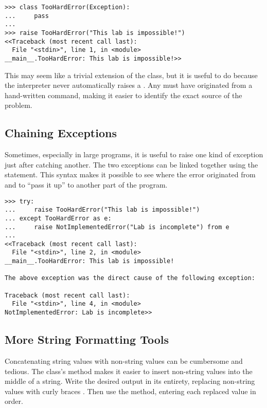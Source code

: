 \begin{lstlisting}
>>> class TooHardError(Exception):
...     pass
...
>>> raise TooHardError("This lab is impossible!")
<<Traceback (most recent call last):
  File "<stdin>", line 1, in <module>
__main__.TooHardError: This lab is impossible!>>
\end{lstlisting}

This may seem like a trivial extension of the  class, but it is useful to do because the interpreter never automatically raises a .
Any  must have originated from a hand-written  command, making it easier to identify the exact source of the problem.

\subsection*{Chaining Exceptions} %

Sometimes, especially in large programs, it is useful to raise one kind of exception just after catching another.
The two exceptions can be linked together using the  statement.
This syntax makes it possible to see where the error originated from and to ``pass it up'' to another part of the program.

\begin{lstlisting}
>>> try:
...     raise TooHardError("This lab is impossible!")
... except TooHardError as e:
...     raise NotImplementedError("Lab is incomplete") from e
...
<<Traceback (most recent call last):
  File "<stdin>", line 2, in <module>
__main__.TooHardError: This lab is impossible!

The above exception was the direct cause of the following exception:

Traceback (most recent call last):
  File "<stdin>", line 4, in <module>
NotImplementedError: Lab is incomplete>>
\end{lstlisting}

\subsection*{More String Formatting Tools} %

Concatenating string values with non-string values can be cumbersome and tedious.
The  class's  method makes it easier to insert non-string values into the middle of a string.
Write the desired output in its entirety, replacing non-string values with curly braces \li{\{\}}.
Then use the  method, entering each replaced value in order.

